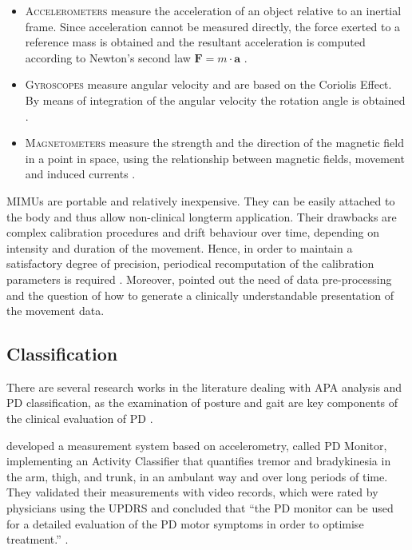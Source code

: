 \begin{itemize}

\item \textsc{Accelerometers} measure the acceleration of an object relative to an inertial frame. Since acceleration cannot be measured directly, the force exerted to a reference mass is obtained and the resultant acceleration is computed according to Newton's second law $ \mathbf{F} = m \cdot \mathbf a $ \cite{encyclopedia_britannica_accelerometer_2014}.

\item \textsc{Gyroscopes} measure angular velocity and are based on the Coriolis Effect. By means of integration of the angular velocity the rotation angle is obtained \cite{olivares_vicente_signal_2013}.

\item \textsc{Magnetometers} measure the strength and the direction of the magnetic field in a point in space, using the relationship between magnetic fields, movement and induced currents \cite{olivares_vicente_signal_2013}.
 
\end{itemize}
MIMUs are portable and relatively inexpensive. They can be easily attached to the body and thus allow non-clinical longterm application. Their drawbacks are complex calibration procedures and drift behaviour over time, depending on intensity and duration of the movement. Hence, in order to maintain a satisfactory degree of precision, periodical recomputation of the calibration parameters is required \cite{olivares_vicente_signal_2013}. Moreover, \citeauthor{mancini_isway:_2012} \cite{mancini_isway:_2012} pointed out the need of data pre-processing and the question of how to generate a clinically understandable presentation of the movement data.

\subsection{Classification}

There are several research works in the literature dealing with APA analysis and PD classification, as the examination of posture and gait are key components of the clinical evaluation of PD \cite{palmerini_classification_2013}.

\citeauthor{klerk_long-term_2009} \cite{klerk_long-term_2009} developed a measurement system based on accelerometry, called PD Monitor, implementing an Activity Classifier that quantifies tremor and bradykinesia in the arm, thigh, and trunk, in an ambulant way and over long periods of time. They validated their measurements with video records, which were rated by physicians using the UPDRS and concluded that ``the PD monitor can be used for a detailed evaluation of the PD motor symptoms in order to optimise treatment.'' \cite{klerk_long-term_2009}.

